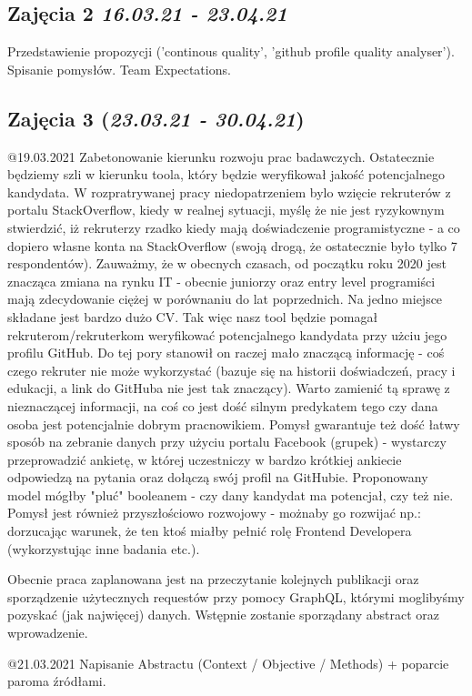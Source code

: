 \documentclass[graybox]{svmult}
\begin{document}
\subsection{Zajęcia 2 \emph{16.03.21 - 23.04.21}}
Przedstawienie propozycji ('continous quality', 'github profile quality analyser'). Spisanie pomysłów. Team Expectations.
\subsection{Zajęcia 3 (\emph{23.03.21 - 30.04.21})}
@19.03.2021 Zabetonowanie kierunku rozwoju prac badawczych. Ostatecznie będziemy szli w kierunku toola, który będzie weryfikował jakość potencjalnego kandydata. W rozpratrywanej pracy niedopatrzeniem bylo wzięcie rekruterów z portalu StackOverflow, kiedy w realnej sytuacji, myślę że nie jest ryzykownym stwierdzić, iż rekruterzy rzadko kiedy mają doświadczenie programistyczne - a co dopiero własne konta na StackOverflow (swoją drogą, że ostatecznie było tylko 7 respondentów). Zauważmy, że w obecnych czasach, od początku roku 2020 jest znacząca zmiana na rynku IT - obecnie juniorzy oraz entry level programiści mają zdecydowanie ciężej w porównaniu do lat poprzednich. Na jedno miejsce składane jest bardzo dużo CV. Tak więc nasz tool będzie pomagał rekruterom/rekruterkom weryfikować potencjalnego kandydata przy użciu jego profilu GitHub. Do tej pory stanowił on raczej mało znaczącą informację - coś czego rekruter nie może wykorzystać (bazuje się na historii doświadczeń, pracy i edukacji, a link do GitHuba nie jest tak znaczący). Warto zamienić tą sprawę z nieznaczącej informacji, na coś co jest dość silnym predykatem tego czy dana osoba jest potencjalnie dobrym pracnowikiem. Pomysł gwarantuje też dość łatwy sposób na zebranie danych przy użyciu portalu Facebook (grupek) - wystarczy przeprowadzić ankietę, w której uczestniczy w bardzo krótkiej ankiecie odpowiedzą na pytania oraz dołączą swój profil na GitHubie. Proponowany model mógłby "pluć" booleanem - czy dany kandydat ma potencjał, czy też nie. Pomysł jest również przyszłościowo rozwojowy - możnaby go rozwijać np.: dorzucając warunek, że ten ktoś miałby pełnić rolę Frontend Developera (wykorzystując inne badania etc.). 

Obecnie praca zaplanowana jest na przeczytanie kolejnych publikacji oraz sporządzenie użytecznych requestów przy pomocy GraphQL, którymi moglibyśmy pozyskać (jak najwięcej) danych. Wstępnie zostanie sporządany abstract oraz wprowadzenie.

@21.03.2021 Napisanie Abstractu (Context / Objective / Methods) + poparcie paroma źródłami.
\end{document}
